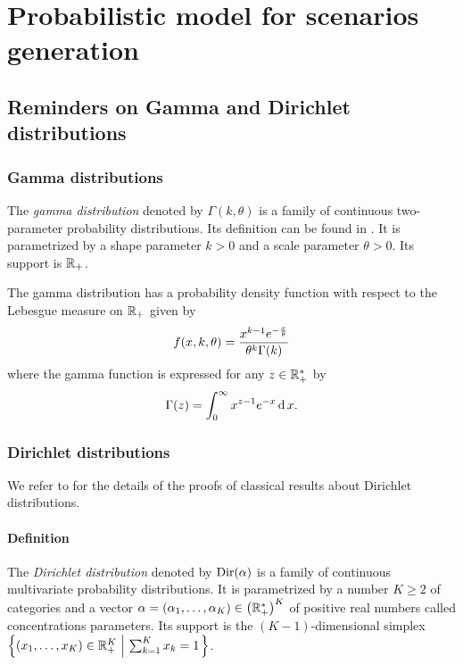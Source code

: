 \chapter{Probabilistic model for scenarios generation}
\label{chap:appendix:probabilistic-model}


\section{Reminders on Gamma and Dirichlet distributions}
\label{sec:reminders:gamma-and-dirichlet-distributions}


\subsection{Gamma distributions}


The \emph{gamma distribution} denoted by $\Gamma(k,\theta)$ is a family of continuous two-parameter probability distributions.
Its definition can be found in \citet[Appendix A]{Delmas2006}.
It is parametrized by a shape parameter $k>0$ and a scale parameter $\theta>0$.
Its support is $\mathbb{R}_+$.


The gamma distribution has a probability density function with respect to the Lebesgue measure on $\mathbb{R}_+$ given by
\begin{equation}\label{eq:dirchlet:probability-density-function}
  f\bracket{x,k,\theta} = \frac{x^{k-1}e^{-\frac{x}{\theta}}}{ \theta^k\Gamma\bracket{k} }
\end{equation}
where the gamma function is expressed for any $z\in\mathbb{R}_+^*$ by
\begin{equation}
  \Gamma\bracket{z} = \int_0^{\infty} x^{z-1}e^{-x} \diff x.
\end{equation}


\subsection{Dirichlet distributions}


We refer to \citet[Chapter 49]{Kotz2000} for the details of the proofs of classical results about Dirichlet distributions.


\subsubsection{Definition}


The \emph{Dirichlet distribution} denoted by $\operatorname{Dir}(\alpha)$ is a family of continuous multivariate probability distributions.
It is parametrized by a number $K \ge 2$ of categories and a vector $\alpha=\bracket{\alpha_1,\ldots,\alpha_K}\in\bracket{\RR_+^*}^K$ of positive real numbers called concentrations parameters.
Its support is the $(K-1)$-dimensional simplex $\crbracket{\bracket{x_1,\ldots,x_K}\in\RR_+^K\ \left|\ \sum_{k=1}^K x_k = 1\right.}$.


